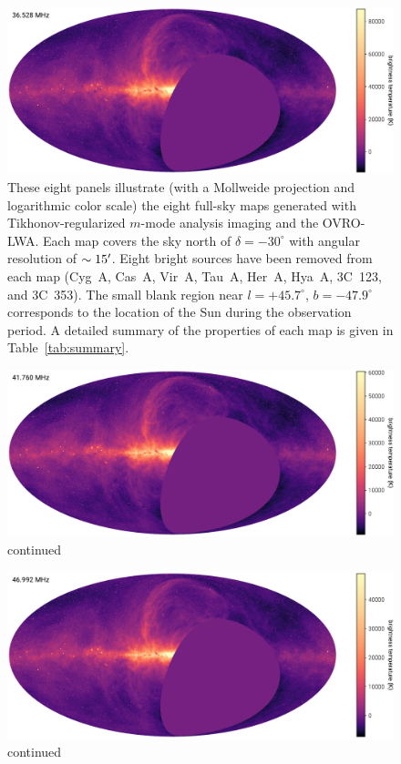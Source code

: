 \begin{bibunit}
\begin{figure}
    \centering
    \includegraphics[width=\textwidth]{figures/chapter3/spw04}
    \caption{
        These eight panels illustrate (with a Mollweide projection and logarithmic color scale) the
        eight full-sky maps generated with Tikhonov-regularized $m$-mode analysis imaging and the
        OVRO-LWA.  Each map covers the sky north of $\delta=-30^\circ$ with angular resolution of
        $\sim15\mbox{$^\prime$}$. Eight bright sources have been removed from each map (Cyg~A, Cas~A, Vir~A,
        Tau~A, Her~A, Hya~A, 3C~123, and 3C~353). The small blank region near $l=+45.7^\circ$,
        $b=-47.9^\circ$ corresponds to the location of the Sun during the observation period.  A
        detailed summary of the properties of each map is given in Table~\ref{tab:summary}.
    }
    \label{fig:channel-maps}
\end{figure}

\addtocounter{figure}{-1}
\begin{figure}
    \centering
    \includegraphics[width=\textwidth]{figures/chapter3/spw06}
    \caption{
        continued
    }
\end{figure}

\addtocounter{figure}{-1}
\begin{figure}
    \centering
    \includegraphics[width=\textwidth]{figures/chapter3/spw08}
    \caption{
        continued
    }
\end{figure}


\end{bibunit}
